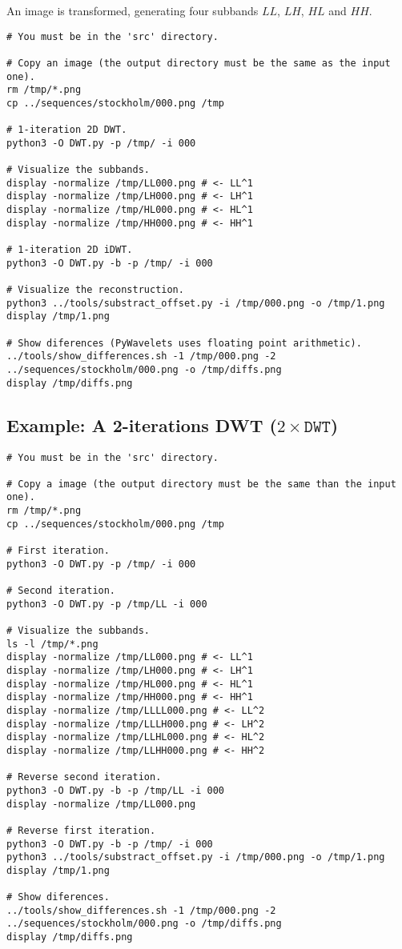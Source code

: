 An image is transformed, generating four subbands $LL$, $LH$, $HL$ and
$HH$.
\begin{verbatim}
# You must be in the 'src' directory.

# Copy an image (the output directory must be the same as the input one).
rm /tmp/*.png
cp ../sequences/stockholm/000.png /tmp

# 1-iteration 2D DWT.
python3 -O DWT.py -p /tmp/ -i 000

# Visualize the subbands.
display -normalize /tmp/LL000.png # <- LL^1
display -normalize /tmp/LH000.png # <- LH^1
display -normalize /tmp/HL000.png # <- HL^1
display -normalize /tmp/HH000.png # <- HH^1

# 1-iteration 2D iDWT.
python3 -O DWT.py -b -p /tmp/ -i 000

# Visualize the reconstruction.
python3 ../tools/substract_offset.py -i /tmp/000.png -o /tmp/1.png
display /tmp/1.png

# Show diferences (PyWavelets uses floating point arithmetic).
../tools/show_differences.sh -1 /tmp/000.png -2 ../sequences/stockholm/000.png -o /tmp/diffs.png
display /tmp/diffs.png
\end{verbatim}


\subsection*{Example: A 2-iterations DWT ($2\times\mathtt{DWT}$)}

\begin{verbatim}
# You must be in the 'src' directory.

# Copy a image (the output directory must be the same than the input one).
rm /tmp/*.png
cp ../sequences/stockholm/000.png /tmp

# First iteration.
python3 -O DWT.py -p /tmp/ -i 000

# Second iteration.
python3 -O DWT.py -p /tmp/LL -i 000

# Visualize the subbands.
ls -l /tmp/*.png
display -normalize /tmp/LL000.png # <- LL^1
display -normalize /tmp/LH000.png # <- LH^1
display -normalize /tmp/HL000.png # <- HL^1
display -normalize /tmp/HH000.png # <- HH^1
display -normalize /tmp/LLLL000.png # <- LL^2
display -normalize /tmp/LLLH000.png # <- LH^2
display -normalize /tmp/LLHL000.png # <- HL^2
display -normalize /tmp/LLHH000.png # <- HH^2

# Reverse second iteration.
python3 -O DWT.py -b -p /tmp/LL -i 000
display -normalize /tmp/LL000.png

# Reverse first iteration.
python3 -O DWT.py -b -p /tmp/ -i 000
python3 ../tools/substract_offset.py -i /tmp/000.png -o /tmp/1.png
display /tmp/1.png

# Show diferences.
../tools/show_differences.sh -1 /tmp/000.png -2 ../sequences/stockholm/000.png -o /tmp/diffs.png
display /tmp/diffs.png
\end{verbatim}

